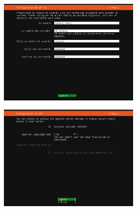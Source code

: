 \documentclass[twoside]{article}
\begin{document}
\begin{figure}[H]
    \centering
    \begin{subfigure}{.5\textwidth}
        \centering
        \includegraphics[width=7cm]{../images/5.png}
    \end{subfigure}%
    \begin{subfigure}{.5\textwidth}
        \centering
        \includegraphics[width=7cm]{../images/6.png}
    \end{subfigure}
\end{figure}
\end{document}
